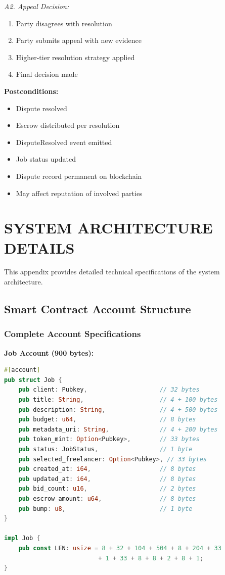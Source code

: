 \documentclass[a4paper,13pt,twoside]{report}
\theoremstyle{definition}
\begin{document}
\textit{A2. Appeal Decision:}
\begin{enumerate}
    \item Party disagrees with resolution
    \item Party submits appeal with new evidence
    \item Higher-tier resolution strategy applied
    \item Final decision made
\end{enumerate}

\textbf{Postconditions:}
\begin{itemize}
    \item Dispute resolved
    \item Escrow distributed per resolution
    \item DisputeResolved event emitted
    \item Job status updated
    \item Dispute record permanent on blockchain
    \item May affect reputation of involved parties
\end{itemize}

\chapter{SYSTEM ARCHITECTURE DETAILS}
\label{appendix:architecture}

This appendix provides detailed technical specifications of the system architecture.

\section{Smart Contract Account Structure}

\subsection{Complete Account Specifications}

\textbf{Job Account (900 bytes):}
\begin{lstlisting}[language=Rust]
#[account]
pub struct Job {
    pub client: Pubkey,                    // 32 bytes
    pub title: String,                     // 4 + 100 bytes
    pub description: String,               // 4 + 500 bytes
    pub budget: u64,                       // 8 bytes
    pub metadata_uri: String,              // 4 + 200 bytes
    pub token_mint: Option<Pubkey>,        // 33 bytes
    pub status: JobStatus,                 // 1 byte
    pub selected_freelancer: Option<Pubkey>, // 33 bytes
    pub created_at: i64,                   // 8 bytes
    pub updated_at: i64,                   // 8 bytes
    pub bid_count: u16,                    // 2 bytes
    pub escrow_amount: u64,                // 8 bytes
    pub bump: u8,                          // 1 byte
}

impl Job {
    pub const LEN: usize = 8 + 32 + 104 + 504 + 8 + 204 + 33
                          + 1 + 33 + 8 + 8 + 2 + 8 + 1;
}
\end{lstlisting}
\end{document}
